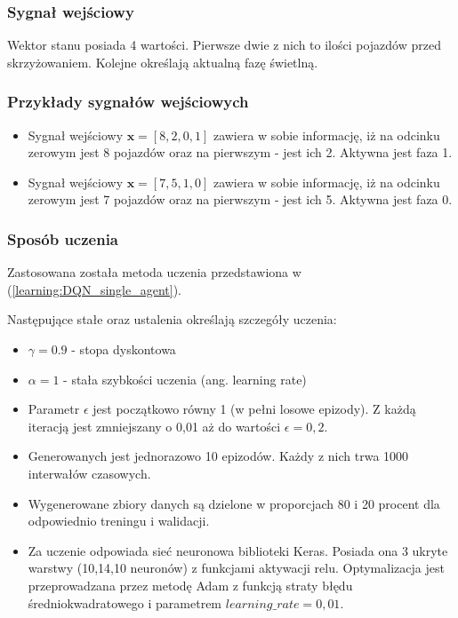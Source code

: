 \documentclass[12pt]{book}
\theoremstyle{plain}
\newcommand{\myref}[1]{(\ref{#1})}
\begin{document}
\subsubsection*{Sygnał wejściowy}
Wektor stanu posiada 4 wartości. Pierwsze dwie z nich to ilości pojazdów przed skrzyżowaniem. Kolejne określają aktualną fazę świetlną.
\subsubsection*{Przykłady sygnałów wejściowych}
\begin{itemize}
	\item Sygnał wejściowy $ \textbf{x}=[8,2,0,1] $ zawiera w sobie informację, iż na odcinku zerowym jest 8 pojazdów oraz na pierwszym - jest ich 2. Aktywna jest faza 1.
		\item Sygnał wejściowy $ \textbf{x}=[7,5,1,0] $ zawiera w sobie informację, iż na odcinku zerowym jest 7 pojazdów oraz na pierwszym - jest ich 5. Aktywna jest faza 0.
\end{itemize}
\subsubsection{Sposób uczenia}
Zastosowana została metoda uczenia przedstawiona w \myref{learning:DQN_single_agent}. 

Następujące stałe oraz ustalenia określają szczegóły uczenia:
\begin{itemize}
	\item $\gamma = 0.9$ - stopa dyskontowa
	\item $\alpha = 1$ - stała szybkości uczenia (ang. learning rate)
	\item Parametr $\epsilon$ jest początkowo równy 1 (w pełni losowe epizody). Z każdą iteracją jest zmniejszany o 0,01 aż do wartości $\epsilon=0,2$.
	\item Generowanych jest jednorazowo 10 epizodów. Każdy z nich trwa 1000 interwałów czasowych.
	\item Wygenerowane zbiory danych są dzielone w proporcjach 80 i 20 procent dla odpowiednio treningu i walidacji.
	\item Za uczenie odpowiada sieć neuronowa biblioteki Keras. Posiada ona 3 ukryte warstwy (10,14,10 neuronów) z funkcjami aktywacji relu. Optymalizacja jest przeprowadzana przez metodę Adam z funkcją straty błędu średniokwadratowego i parametrem $learning\_rate = 0,01$. 
\end{itemize}
\end{document}
